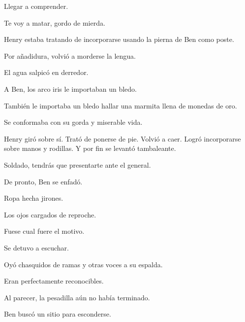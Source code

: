 \sk
Llegar a comprender. 

\sk
Te voy a matar, gordo de mierda.

\sk
Henry estaba tratando de incorporarse usando
la pierna de Ben como poste.

\sk
Por añadidura, volvió a morderse la lengua.

\sk
El agua salpicó en derredor.

\sk
A Ben, los arco iris le importaban un bledo.

\sk
También le importaba un bledo hallar una marmita llena de
monedas de oro.

\sk
Se conformaba con su gorda y miserable vida.

\sk
Henry giró sobre sí. Trató de ponerse de pie.
Volvió a caer. Logró incorporarse sobre manos y
rodillas. Y por fin se levantó tambaleante.

\sk
Soldado, tendrás que presentarte ante el general.

\sk
De pronto, Ben se enfadó.

\sk
Ropa hecha jirones. 

\sk
Los ojos cargados de reproche. 

\sk
Fuese cual fuere el motivo.

\sk
Se detuvo a escuchar. 

\sk
Oyó chasquidos de ramas y otras voces a su
espalda.

\sk
Eran perfectamente reconocibles.

\sk
Al parecer, la pesadilla aún no había terminado.

\sk
Ben buscó un sitio para esconderse.


